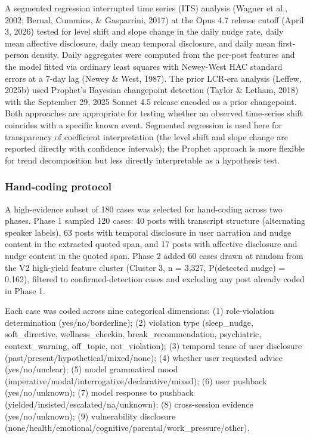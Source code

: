 \documentclass[11pt]{article}
\begin{document}
A segmented regression interrupted time series (ITS) analysis (Wagner et al., 2002; Bernal, Cummins, \& Gasparrini, 2017) at the Opus 4.7 release cutoff (April 3, 2026) tested for level shift and slope change in the daily nudge rate, daily mean affective disclosure, daily mean temporal disclosure, and daily mean first-person density. Daily aggregates were computed from the per-post features and the model fitted via ordinary least squares with Newey-West HAC standard errors at a 7-day lag (Newey \& West, 1987). The prior LCR-era analysis (Leffew, 2025b) used Prophet's Bayesian changepoint detection (Taylor \& Letham, 2018) with the September 29, 2025 Sonnet 4.5 release encoded as a prior changepoint. Both approaches are appropriate for testing whether an observed time-series shift coincides with a specific known event. Segmented regression is used here for transparency of coefficient interpretation (the level shift and slope change are reported directly with confidence intervals); the Prophet approach is more flexible for trend decomposition but less directly interpretable as a hypothesis test.

\subsubsection{Hand-coding protocol}

A high-evidence subset of 180 cases was selected for hand-coding across two phases. Phase 1 sampled 120 cases: 40 posts with transcript structure (alternating speaker labels), 63 posts with temporal disclosure in user narration and nudge content in the extracted quoted span, and 17 posts with affective disclosure and nudge content in the quoted span. Phase 2 added 60 cases drawn at random from the V2 high-yield feature cluster (Cluster 3, n = 3,327, P(detected nudge) = 0.162), filtered to confirmed-detection cases and excluding any post already coded in Phase 1.

Each case was coded across nine categorical dimensions: (1) role-violation determination (yes/no/borderline); (2) violation type (sleep\_nudge, soft\_directive, wellness\_checkin, break\_recommendation, psychiatric, context\_warning, off\_topic, not\_violation); (3) temporal tense of user disclosure (past/present/hypothetical/mixed/none); (4) whether user requested advice (yes/no/unclear); (5) model grammatical mood (imperative/modal/interrogative/declarative/mixed); (6) user pushback (yes/no/unknown); (7) model response to pushback (yielded/insisted/escalated/na/unknown); (8) cross-session evidence (yes/no/unknown); (9) vulnerability disclosure (none/health/emotional/cognitive/parental/work\_pressure/other).
\end{document}
